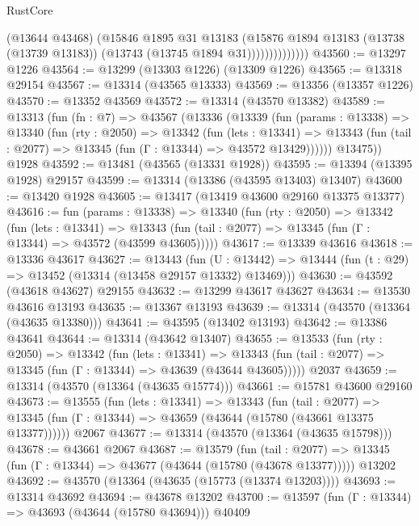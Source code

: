 \begin{lexlean}{RustCore}
\begin{coremodule}
                        (@13644 @43468)
                        (@15846
                          @1895
                          @31
                          @13183
                          (@15876
                            @1894
                            @13183
                            (@13738 (@13739 @13183))
                            (@13743 (@13745 @1894 @31))))))))))))))
@43560 := @13297 @1226
@43564 := @13299 (@13303 @1226) (@13309 @1226)
@43565 := @13318 @29154
@43567 := @13314 (@43565 @13333)
@43569 := @13356 (@13357 @1226)
@43570 := @13352 @43569
@43572 := @13314 (@43570 @13382)
@43589 := @13313
    (fun (fn : @7) =>
    @43567
      (@13336
        (@13339
          (fun (params : @13338) =>
          @13340
            (fun (rty : @2050) =>
            @13342
              (fun (lets : @13341) =>
              @13343 (fun (tail : @2077) => @13345 (fun (Γ : @13344) => @43572 @13429))))))
        @13475))
    @1928
@43592 := @13481 (@43565 (@13331 @1928))
@43595 := @13394 (@13395 @1928) @29157
@43599 := @13314 (@13386 (@43595 @13403) @13407)
@43600 := @13420 @1928
@43605 := @13417 (@13419 @43600 @29160 @13375 @13377)
@43616 := fun (params : @13338) =>
  @13340
    (fun (rty : @2050) =>
    @13342
      (fun (lets : @13341) =>
      @13343 (fun (tail : @2077) => @13345 (fun (Γ : @13344) => @43572 (@43599 @43605)))))
@43617 := @13339 @43616
@43618 := @13336 @43617
@43627 := @13443
    (fun (U : @13442) => @13444 (fun (t : @29) => @13452 (@13314 (@13458 @29157 @13332) @13469)))
@43630 := @43592 (@43618 @43627) @29155
@43632 := @13299 @43617 @43627
@43634 := @13530 @43616 @13193
@43635 := @13367 @13193
@43639 := @13314 (@43570 (@13364 (@43635 @13380)))
@43641 := @43595 (@13402 @13193)
@43642 := @13386 @43641
@43644 := @13314 (@43642 @13407)
@43655 := @13533
    (fun (rty : @2050) =>
    @13342
      (fun (lets : @13341) =>
      @13343 (fun (tail : @2077) => @13345 (fun (Γ : @13344) => @43639 (@43644 @43605)))))
    @2037
@43659 := @13314 (@43570 (@13364 (@43635 @15774)))
@43661 := @15781 @43600 @29160
@43673 := @13555
    (fun (lets : @13341) =>
    @13343
      (fun (tail : @2077) =>
      @13345 (fun (Γ : @13344) => @43659 (@43644 (@15780 (@43661 @13375 @13377))))))
    @2067
@43677 := @13314 (@43570 (@13364 (@43635 @15798)))
@43678 := @43661 @2067
@43687 := @13579
    (fun (tail : @2077) => @13345 (fun (Γ : @13344) => @43677 (@43644 (@15780 (@43678 @13377)))))
    @13202
@43692 := @43570 (@13364 (@43635 (@15773 (@13374 @13203))))
@43693 := @13314 @43692
@43694 := @43678 @13202
@43700 := @13597 (fun (Γ : @13344) => @43693 (@43644 (@15780 @43694))) @40409

\end{coremodule}
\end{lexlean}
